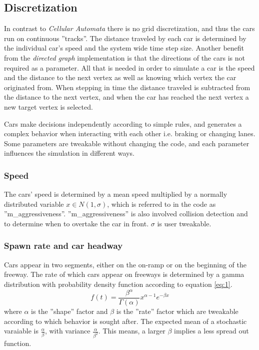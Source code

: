 \documentclass{article}
\begin{document}
  \subsection{Discretization}
    In contrast to \textit{Cellular Automata}
    there is no grid discretization, and thus the cars run on continuous ''tracks''.
    The distance traveled by each car is determined by the individual car's speed and
    the system wide time step size.
    Another benefit from the \textit{directed graph} implementation is that
    the directions of the cars is not required as a parameter. All that is needed in
    order to simulate a car is the speed and the distance
    to the next vertex as well as knowing which vertex the car originated from.
    When stepping in time the distance traveled is subtracted from the distance to the next vertex, and
    when the car has reached the next vertex a new target vertex is selected.

    Cars make decisions independently according to simple rules, and generates
    a complex behavior when interacting with each other i.e. braking or changing lanes.
    Some parameters are tweakable without changing the code, and each parameter
    influences the simulation in different ways.
    \subsubsection{Speed}
      The cars' speed is determined by a mean speed multiplied by a normally distributed
      variable $x \in N(1,\sigma)$, which is referred to in the code as
      ''m\_aggressiveness''. ''m\_aggressiveness'' is also involved collision detection
      and to determine when to overtake the car in front. $\sigma$ is user tweakable.
    \subsubsection{Spawn rate and car headway}
      Cars appear in two segments, either on the on-ramp or on the beginning of the freeway.
      The rate of
      which cars appear on freeways is determined by a gamma distribution
      with probability density function according to equation \ref{eq:1}. \cite{abdel-rahim_ce571:_nodate}
      \begin{equation}
        f(t) = \frac{\beta^{\alpha}}{\Gamma(\alpha)}x^{\alpha-1}e^{-\beta x}
        \label{eq:1}
      \end{equation}
      where $\alpha$ is the ''shape'' factor and $\beta$ is the ''rate'' factor which are
      tweakable according to which behavior is sought after. The expected mean of a
      stochastic varaiable is $\frac{\alpha}{\beta}$, with variance $\frac{\alpha}{\beta^{2}}$.
      This means, a larger $\beta$ implies a less spread out function.
\end{document}
